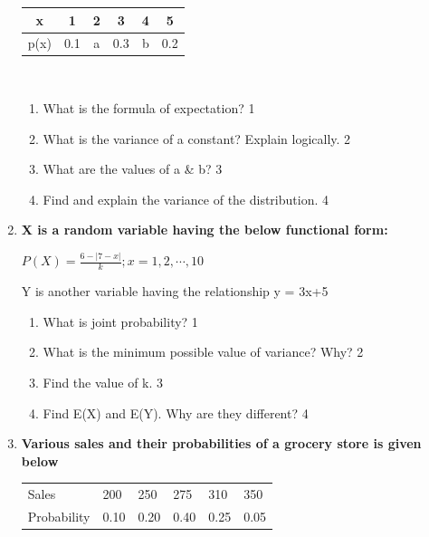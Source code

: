 \documentclass[a4paper,oneside, margin=1.4in]{book}
\begin{document}
\begin{enumerate}
	  \begin{table}[h]
	  \begin{center}
\begin{tabular}{c|c|c|c|c|c}
x    & 1   & 2 & 3   & 4 & 5   \\ \hline
p(x) & 0.1 & a & 0.3 & b & 0.2 
\end{tabular} \\
\end{center}	
\end{table}
    
  \begin{enumerate}
    \item
	What is the formula of expectation? \hfill 1
    \item
	What is the variance of a constant? Explain logically. \hfill 2
    \item  
	What are the values of a \& b? \hfill 3
    \item
	Find and explain the variance of the distribution. \hfill 4
  \end{enumerate}
  
       \item
	  \textbf{X is a random variable having the below functional form:} 
  
  \begin{center}
  $P(X) = \frac{6-|7-x|}{k}; x = 1, 2, \cdots,10$ \\
  \end{center}  
  
  Y is another variable having the relationship y = 3x+5
  
  \begin{enumerate}
    \item
	What is joint probability? \hfill 1
    \item
	What is the minimum possible value of variance? Why? \hfill 2
    \item  
	Find the value of k. \hfill 3
    \item
	Find E(X) and E(Y). Why are they different? \hfill 4
  \end{enumerate}
  
       \item
  \textbf{Various sales and their probabilities of a grocery store is given below}
  
  \begin{table}[h]
  \centering
\begin{tabular}{llllll}
Sales & 200 & 250 & 275 & 310 & 350 \\
Probability & 0.10 & 0.20 & 0.40 & 0.25 & 0.05
\end{tabular}
\end{table}


\end{enumerate}
\end{document}
